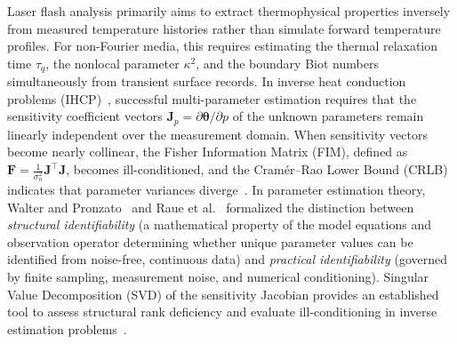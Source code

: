 \documentclass[preprint,12pt]{elsarticle}
\begin{document}
Laser flash analysis primarily aims to extract thermophysical properties inversely from measured temperature histories rather than simulate forward temperature profiles. For non-Fourier media, this requires estimating the thermal relaxation time $\tau_q$, the nonlocal parameter $\kappa^2$, and the boundary Biot numbers simultaneously from transient surface records. In inverse heat conduction problems (IHCP)~\cite{beck1985inverse,alifanov1994inverse,ozisik2000inverse}, successful multi-parameter estimation requires that the sensitivity coefficient vectors $\bm{J}_p = \partial \bm{\theta} / \partial p$ of the unknown parameters remain linearly independent over the measurement domain. When sensitivity vectors become nearly collinear, the Fisher Information Matrix (FIM), defined as $\bm{F} = \frac{1}{\sigma_n^2} \bm{J}^\top \bm{J}$, becomes ill-conditioned, and the Cramér--Rao Lower Bound (CRLB) indicates that parameter variances diverge~\cite{emery2000uncertainties,troger2022identification}. In parameter estimation theory, Walter and Pronzato~\cite{walter1996identifiability} and Raue et al.~\cite{raue2009structural} formalized the distinction between \textit{structural identifiability} (a mathematical property of the model equations and observation operator determining whether unique parameter values can be identified from noise-free, continuous data) and \textit{practical identifiability} (governed by finite sampling, measurement noise, and numerical conditioning). Singular Value Decomposition (SVD) of the sensitivity Jacobian provides an established tool to assess structural rank deficiency and evaluate ill-conditioning in inverse estimation problems~\cite{aster2019parameter}.
\end{document}
